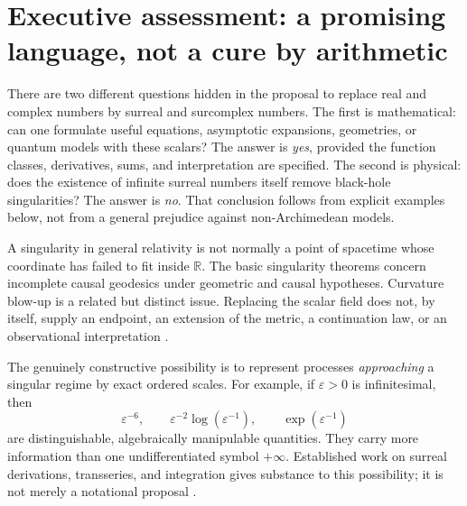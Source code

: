 \documentclass[11pt,letterpaper]{article}
\newcommand{\R}{\mathbb{R}}
\newcommand{\eps}{\varepsilon}
\theoremstyle{definition}
\theoremstyle{remark}
\begin{document}
\begingroup
\small
\setlength{\parskip}{0pt}
\tableofcontents
\endgroup
\newpage

\section{Executive assessment: a promising language, not a cure by arithmetic}
\label{sec:assessment}

There are two different questions hidden in the proposal to replace real and
complex numbers by surreal and surcomplex numbers.
The first is mathematical: can one formulate useful equations, asymptotic
expansions, geometries, or quantum models with these scalars? The answer is
\emph{yes}, provided the function classes, derivatives, sums, and interpretation
are specified. The second is physical: does the existence of infinite surreal
numbers itself remove black-hole singularities? The answer is \emph{no}. That
conclusion follows from explicit examples below, not from a general prejudice
against non-Archimedean models.

A singularity in general relativity is not normally a point of spacetime whose
coordinate has failed to fit inside $\R$. The basic singularity theorems concern
incomplete causal geodesics under geometric and causal hypotheses. Curvature
blow-up is a related but distinct issue. Replacing the scalar field does not,
by itself, supply an endpoint, an extension of the metric, a continuation law,
or an observational interpretation \cite{Penrose,Witten,Landsman}.

The genuinely constructive possibility is to represent processes \emph{approaching}
a singular regime by exact ordered scales. For example, if $\eps>0$ is
infinitesimal, then
\[
 \eps^{-6},\qquad \eps^{-2}\log(\eps^{-1}),\qquad
 \exp(\eps^{-1})
\]
are distinguishable, algebraically manipulable quantities. They carry more
information than one undifferentiated symbol $+\infty$. Established work on
surreal derivations, transseries, and integration gives substance to this
possibility; it is not merely a notational proposal
\cite{BerarducciMantova,ADH,CostinEhrlich}.
\end{document}
